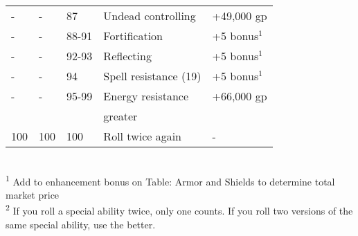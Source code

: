 \begin{table}[]
\begin{tabular}{lllll}
- & - & 87 & Undead controlling & +49,000 gp\\
- & - & 88-91 & Fortification & +5 bonus\(^{1}\)\\
- & - & 92-93 & Reflecting & +5 bonus\(^{1}\)\\
- & - & 94 & Spell resistance (19) & +5 bonus\(^{1}\)\\
- & - & 95-99 & Energy resistance & +66,000 gp \\
  &   &       & greater & \\
100 & 100 & 100 & Roll twice again & -\\
\end{tabular}\\
\textsuperscript{1} Add to enhancement bonus on Table: Armor and Shields to determine total market price\\
\textsuperscript{2} If you roll a special ability twice, only one counts. If you roll two versions of the same special ability, use the better.\\
\end{table}

